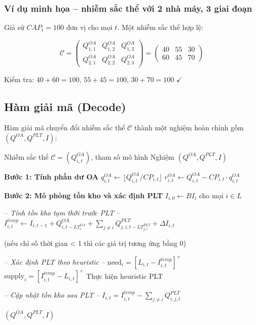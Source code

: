 \documentclass[12pt]{article}
\newcommand{\QOA}{Q^{OA}}
\newcommand{\QPLT}{Q^{PLT}}
\newcommand{\qOA}{q^{OA}}
\newcommand{\rOA}{r^{OA}}
\begin{document}
\subsubsection{Ví dụ minh họa -- nhiễm sắc thể với 2 nhà máy, 3 giai đoạn}

Giả sử $CAP_t = 100$ đơn vị cho mọi $t$. Một nhiễm sắc thể hợp lệ:

\[
\mathcal{C} =
\begin{pmatrix}
  \QOA_{1,1} & \QOA_{1,2} & \QOA_{1,3} \\
  \QOA_{2,1} & \QOA_{2,2} & \QOA_{2,3}
\end{pmatrix}
=
\begin{pmatrix}
  40 & 55 & 30 \\
  60 & 45 & 70
\end{pmatrix}
\]

Kiểm tra: $40+60=100$, $55+45=100$, $30+70=100$ $\checkmark$

\subsection{Hàm giải mã (Decode)}

\label{subsec:decode}

Hàm giải mã chuyển đổi nhiễm sắc thể $\mathcal{C}$ thành một nghiệm hoàn chỉnh gồm $(\QOA, \QPLT, I)$:

\begin{algorithm}[H]
\caption{Giải mã nhiễm sắc thể (Decode)}
\begin{algorithmic}[1]
\Require Nhiễm sắc thể $\mathcal{C} = (\QOA_{i,t})$, tham số mô hình
\Ensure Nghiệm $(\QOA, \QPLT, I)$

\State \textbf{Bước 1: Tính phần dư OA}
  \State $\qOA_{i,t} \gets \lfloor \QOA_{i,t} / CP_{i,t} \rfloor$
  \State $\rOA_{i,t} \gets \QOA_{i,t} - CP_{i,t} \cdot \qOA_{i,t}$
\EndFor

\State \textbf{Bước 2: Mô phỏng tồn kho và xác định PLT}
\State $I_{i,0} \gets BI_i$ \quad cho mọi $i \in L$


  \State \textit{-- Tính tồn kho tạm thời trước PLT --}
  \State $I^{temp}_{i,t} \gets I_{i,t-1} 
  + Q^{OA}_{i,t - LT_i^{OA}} 
  + \sum_{j \neq i} Q^{PLT}_{j,i,t - LT_{j,i}^{PLT}} 
  + \Delta I_{i,t}$
  
  \State (nếu chỉ số thời gian < 1 thì các giá trị tương ứng bằng 0)

  \State \textit{-- Xác định PLT theo heuristic --}
    \State $\text{need}_i = [L_{i,t} - I^{temp}_{i,t}]^+$
    \State $\text{supply}_i = [I^{temp}_{i,t} - L_{i,t}]^+$
    \State Thực hiện heuristic PLT
  \EndIf

  \State \textit{-- Cập nhật tồn kho sau PLT --}
  \State $I_{i,t} =
  I^{temp}_{i,t}
  - \sum_{j \neq i} Q^{PLT}_{i,j,t}$

\EndFor

\State \Return $(\QOA, \QPLT, I)$
\end{algorithmic}
\end{algorithm}
\end{document}
